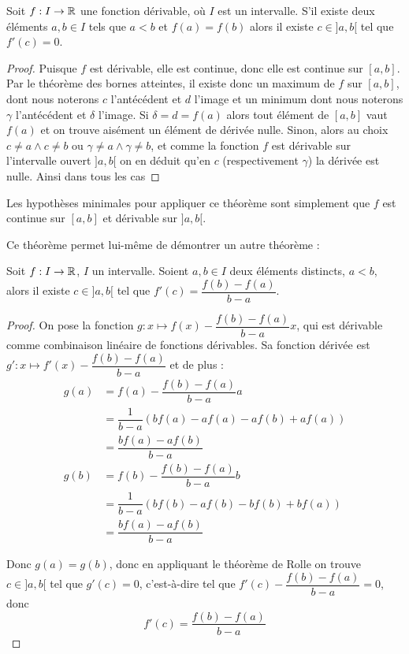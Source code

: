 \begin{them}[Rolle]
    Soit $f : I \to\mathbb{R}$ une fonction dérivable, où $I$ est un intervalle. S'il existe deux éléments $a,b\in I$ tels que $a < b$ et $f(a) = f(b)$ alors il existe $c\in ]a,b[$ tel que $f'(c) = 0$.
\end{them}

\begin{proof}
    Puisque $f$ est dérivable, elle est continue, donc elle est continue sur $[a,b]$. Par le théorème des bornes atteintes, il existe donc un maximum de $f$ sur $[a,b]$, dont nous noterons $c$ l'antécédent et $d$ l'image et un minimum dont nous noterons $\gamma$ l'antécédent et $\delta$ l'image. Si $\delta = d =  f(a)$ alors tout élément de $[a,b]$ vaut $f(a)$ et on trouve aisément un élément de dérivée nulle. Sinon, alors au choix $c\neq a\land c\neq b$ ou $\gamma\neq a\land \gamma\neq b$, et comme la fonction $f$ est dérivable sur l'intervalle ouvert $]a,b[$ on en déduit qu'en $c$ (respectivement $\gamma$) la dérivée est nulle. Ainsi dans tous les cas 
\end{proof}

\begin{rmk}
    Les hypothèses minimales pour appliquer ce théorème sont simplement que $f$ est continue sur $[a,b]$ et dérivable sur $]a,b[$.
\end{rmk}

Ce théorème permet lui-même de démontrer un autre théorème :

\begin{them}
    Soit $f : I\to \mathbb{R}$, $I$ un intervalle. Soient $a,b\in I$ deux éléments distincts, $a < b$, alors il existe $c\in]a,b[$ tel que $f'(c) = \dfrac{f(b)-f(a)}{b-a}$.
\end{them}

\begin{proof}
    On pose la fonction $g : x \mapsto f(x)-\dfrac{f(b)-f(a)}{b-a}x$, qui est dérivable comme combinaison linéaire de fonctions dérivables. Sa fonction dérivée est $g' : x \longmapsto f'(x) - \dfrac{f(b)-f(a)}{b-a}$ et de plus : 
    \begin{align*}
        g(a) &= f(a)-\dfrac{f(b)-f(a)}{b-a}a\\
        &= \dfrac{1}{b-a}(bf(a)-af(a)-af(b)+af(a))\\
        &= \dfrac{bf(a)-af(b)}{b-a}\\
        g(b) &= f(b)-\dfrac{f(b)-f(a)}{b-a}b\\
        &= \dfrac{1}{b-a}(bf(b)-af(b)-bf(b)+bf(a))\\
        &= \dfrac{bf(a)-af(b)}{b-a}
    \end{align*}

    Donc $g(a)=g(b)$, donc en appliquant le théorème de Rolle on trouve $c\in]a,b[$ tel que $g'(c) = 0$, c'est-à-dire tel que $f'(c) - \dfrac{f(b)-f(a)}{b-a} = 0$, donc $$\boxed{f'(c) = \dfrac{f(b)-f(a)}{b-a}}$$
\end{proof}

